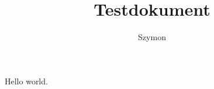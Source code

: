 \documentclass{article}
\author{Szymon}
\title{Testdokument}
\begin{document}
\maketitle
Hello world. 
\end{document}
